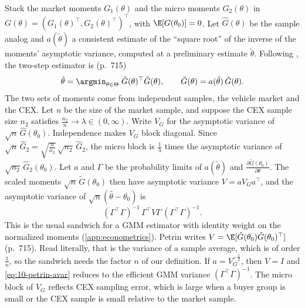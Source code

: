  Stack the market moments $G_1(\theta)$ and the micro moments $G_2(\theta)$ in
$G(\theta) = (G_1(\theta)^\top, G_2(\theta)^\top)^\top$, with $\E[G(\theta_0)] = 0$. Let $\hat G(\theta)$ be the sample
analog and $a(\tilde\theta)$ a consistent estimate of the ``square root'' of the inverse of the moments' asymptotic
variance, computed at a preliminary estimate $\tilde\theta$. Following \citet{Hansen1982}, the two-step estimator is
(p.~715)
\begin{equation}\label{eq:10-petrin-gmm}
  \hat\theta = \argmin_{\theta\in\Theta}\; \tilde G(\theta)^\top\tilde G(\theta), \qquad
  \tilde G(\theta) = a(\tilde\theta)\,\hat G(\theta) .
\end{equation}
The two sets of moments come from independent samples, the vehicle market and the CEX. Let $n$ be the size of the
market sample, and suppose the CEX sample size $n_2$ satisfies $\frac{n_2}{n} \to \lambda \in (0,\infty)$. Write
$V_G$ for the asymptotic variance of $\sqrt{n}\,\hat G(\theta_0)$. Independence makes $V_G$ block diagonal. Since
$\sqrt{n}\,\hat G_2 = \sqrt{\frac{n}{n_2}}\,\sqrt{n_2}\,\hat G_2$, the micro block is $\frac{1}{\lambda}$ times the
asymptotic variance of $\sqrt{n_2}\,\hat G_2(\theta_0)$. Let $a$ and $\Gamma$ be the probability limits of $a(\tilde\theta)$ and
$\frac{\partial\tilde G(\theta_0)}{\partial\theta}$. The scaled moments $\sqrt{n}\,\tilde G(\theta_0)$ then have
asymptotic variance $V = aV_Ga^\top$, and the asymptotic variance of $\sqrt{n}(\hat\theta - \theta_0)$ is
\begin{equation}\label{eq:10-petrin-avar}
  (\Gamma^\top\Gamma)^{-1}\,\Gamma^\top V\Gamma\,(\Gamma^\top\Gamma)^{-1} .
\end{equation}
This is the usual sandwich for a GMM estimator with identity weight on the normalized moments
(\cref{app:econometrics}). Petrin writes $V = \E[\tilde G(\theta_0)\tilde G(\theta_0)^\top]$ (p.~715). Read literally,
that is the variance of a sample average, which is of order $\frac{1}{n}$, so the sandwich needs the factor $n$ of
our definition. If $a = V_G^{-\frac{1}{2}}$, then $V = I$ and \eqref{eq:10-petrin-avar} reduces to the efficient
GMM variance $(\Gamma^\top\Gamma)^{-1}$. The micro block of $V_G$ reflects CEX sampling error, which is large when a
buyer group is small or the CEX sample is small relative to the market sample.

